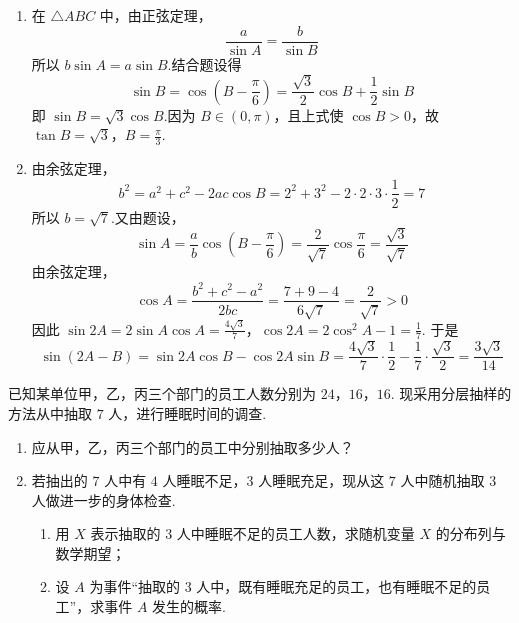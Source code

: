 \begin{solution}
\begin{enumerate}
\item 在 \(\triangle ABC\) 中，由正弦定理，
\[
\frac{a}{\sin A}=\frac{b}{\sin B}
\]
所以 \(b\sin A=a\sin B\).结合题设得
\[
\sin B=\cos\left(B-\frac\pi6\right)
=\frac{\sqrt3}{2}\cos B+\frac12\sin B
\]
即 \(\sin B=\sqrt3\cos B\).因为 \(B\in(0,\pi)\)，且上式使 \(\cos B>0\)，故
\(\tan B=\sqrt3\)，\(B=\frac\pi3\).

\item 由余弦定理，
\[
b^2=a^2+c^2-2ac\cos B
=2^2+3^2-2\cdot2\cdot3\cdot\frac12=7
\]
所以 \(b=\sqrt7\).又由题设，
\[
\sin A=\frac{a}{b}\cos\left(B-\frac\pi6\right)
=\frac{2}{\sqrt7}\cos\frac\pi6=\frac{\sqrt3}{\sqrt7}
\]
由余弦定理，
\[
\cos A=\frac{b^2+c^2-a^2}{2bc}
=\frac{7+9-4}{6\sqrt7}=\frac2{\sqrt7}>0
\]
因此
\(\sin2A=2\sin A\cos A=\frac{4\sqrt3}{7}\)，\(\cos2A=2\cos^2A-1=\frac17\).
于是
\[
\sin(2A-B)=\sin2A\cos B-\cos2A\sin B
=\frac{4\sqrt3}{7}\cdot\frac12-\frac17\cdot\frac{\sqrt3}{2}
=\frac{3\sqrt3}{14}
\]
\end{enumerate}
\end{solution}

\begin{problem}

已知某单位甲，乙，丙三个部门的员工人数分别为 \(24\)，\(16\)，\(16\). 现采用分层抽样的方法从中抽取 \(7\) 人，进行睡眠时间的调查.

\begin{enumerate}
\item 应从甲，乙，丙三个部门的员工中分别抽取多少人？
\item 若抽出的 \(7\) 人中有 \(4\) 人睡眠不足，\(3\) 人睡眠充足，现从这 \(7\) 人中随机抽取 \(3\) 人做进一步的身体检查.
\begin{enumerate}
\item 用 \(X\) 表示抽取的 \(3\) 人中睡眠不足的员工人数，求随机变量 \(X\) 的分布列与数学期望；
\item 设 \(A\) 为事件“抽取的 \(3\) 人中，既有睡眠充足的员工，也有睡眠不足的员工”，求事件 \(A\) 发生的概率.
\end{enumerate}
\end{enumerate}
\end{problem}

